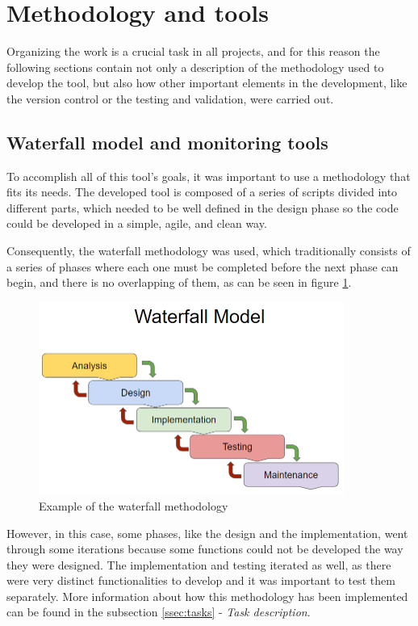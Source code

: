 \section{Methodology and tools}
Organizing the work is a crucial task in all projects, and for this reason the following sections contain not only a description of the methodology used to develop the tool, but also how other important elements in the development, like the version control or the testing and validation, were carried out.

\subsection{Waterfall model and monitoring tools}
\label{ssec:methodology}
To accomplish all of this tool's goals, it was important to use a methodology that fits its needs. The developed tool is composed of a series of scripts divided into different parts, which needed to be well defined in the design phase so the code could be developed in a simple, agile, and clean way.

Consequently, the waterfall methodology was used, which traditionally consists of a series of phases where each one must be completed before the next phase can begin, and there is no overlapping of them, as can be seen in figure \ref{img:waterfallModel}. 

\begin{figure}[!ht]
	\hspace{-1.5cm}
	\centering
	\includegraphics[width=10cm]{img/waterfall-model}
	\caption{Example of the waterfall methodology}
	\label{img:waterfallModel}
\end{figure}


However, in this case, some phases, like the design and the implementation, went through some iterations because some functions could not be developed the way they were designed. The implementation and testing iterated as well, as there were very distinct functionalities to develop and it was important to test them separately. 
More information about how this methodology has been implemented can be found in the subsection \ref{ssec:tasks} - \textit{Task description}.

